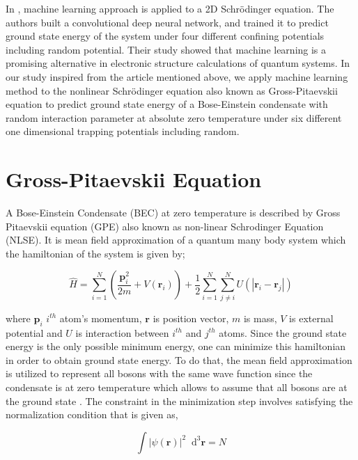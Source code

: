\documentclass[a4paper,times,hidelinks,12pt]{article}
\newcommand*\dif{\mathop{}\!\mathrm{d}}
\begin{document}
In \cite{mills2017deep}, machine learning approach is applied to a 2D Schr{\"o}dinger equation. The authors built a convolutional deep neural network, and trained it to predict ground state energy of the system under four different confining potentials including random potential. Their study showed that machine learning is a promising alternative in electronic structure calculations of quantum systems. In our study inspired from the article mentioned above, we apply machine learning method to the nonlinear Schr{\"o}dinger equation also known as Gross-Pitaevskii equation to predict ground state energy of a Bose-Einstein condensate with random interaction parameter at absolute zero temperature under six different one dimensional trapping potentials including random. 


\section{Gross-Pitaevskii Equation}

A Bose-Einstein Condensate (BEC) at zero temperature is described by Gross Pitaevskii equation (GPE) also known as non-linear Schrodinger Equation (NLSE). It is mean field approximation of a quantum many body system which the hamiltonian of the system is given by;

\begin{equation}
\label{eq:GPE_hamiltonian}
\hat{H} = \sum_{i = 1}^{N} \left(\frac{\boldsymbol{p}_i^2}{2m} + V(\boldsymbol{r}_i) \right) + \frac{1}{2} \sum_{i = 1}^{N} \sum_{j \neq i}^{N} U(|\boldsymbol{r}_i - \boldsymbol{r}_j|)
\end{equation}

\noindent where $\boldsymbol{p}_i$ $i^{th}$ atom's momentum, $\boldsymbol{r}$ is position vector, $m$ is mass, $V$ is external potential and $U$ is interaction between $i^{th}$ and $j^{th}$  atoms. Since the ground state energy is the only possible minimum energy, one can minimize this hamiltonian in order to obtain ground state energy. To do that, the mean field approximation is utilized to represent all bosons with the same wave function since the condensate is at zero temperature which allows to assume that all bosons are at the ground state \cite{pethick2002bose}. The constraint in the minimization step involves satisfying the normalization condition that is given as,


\begin{equation}
\label{eq:GPE_normalization}
\int |\psi(\boldsymbol{r})|^2 \dif^3 \boldsymbol{r} = N    
\end{equation}
\end{document}
